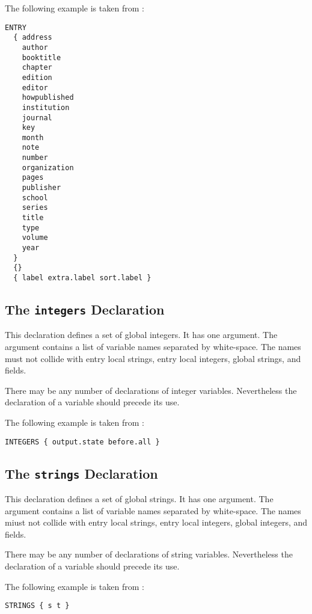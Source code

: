 The following example is taken from :

\begin{lstlisting}[language=bst]
  ENTRY
  { address
    author
    booktitle
    chapter
    edition
    editor
    howpublished
    institution
    journal
    key
    month
    note
    number
    organization
    pages
    publisher
    school
    series
    title
    type
    volume
    year
  }
  {}
  { label extra.label sort.label }
\end{lstlisting}


\subsection{The \texttt{integers} Declaration}%
%
\label{sec:integers}

This declaration defines a set of global integers. It has one
argument. The argument contains a list of variable names separated by
white-space. The names must not collide with entry local strings,
entry local integers, global strings, and fields.

There may be any number of declarations of integer variables.
Nevertheless the declaration of a variable should precede its use.

The following example is taken from :

\begin{lstlisting}[language=bst]
  INTEGERS { output.state before.all }
\end{lstlisting}


\subsection{The \texttt{strings} Declaration}

This declaration defines a set of global strings. It has one argument.
The argument contains a list of variable names separated by
white-space. The names miust not collide with entry local strings,
entry local integers, global integers, and fields.

There may be any number of declarations of string variables.
Nevertheless the declaration of a variable should precede its use.

The following example is taken from :

\begin{lstlisting}[language=bst]
  STRINGS { s t }
\end{lstlisting}


